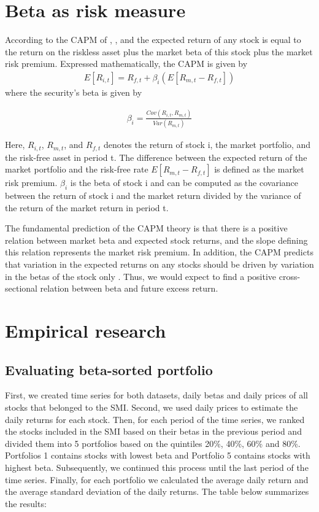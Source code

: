 \documentclass[12pt,a4paper]{article}
\begin{document}
\section{Beta as risk measure}
\begin{justify}
According to the CAPM of , , and  the expected return of any stock is equal to the return on the riskless asset plus the market beta of this stock plus the market risk premium. Expressed mathematically, the CAPM is given by
\begin{align}
    E[R_{i,t}] = R_{f,t}+\beta_{i}(E[R_{m,t}-R_{f,t}])
\end{align}
where the security’s beta is given by

\begin{align}
    \beta_{i} = \frac{Cov(R_{i,t},R_{m,t})}{Var(R_{m,t})} 
\end{align}

Here, $R_{i,t}$, $R_{m,t}$, and $R_{f,t}$ denotes the return of stock i, the market portfolio, and the risk-free asset in period t. The difference between the expected return of the market portfolio and the risk-free rate $E[R_{m,t}-R_{f,t}]$ is defined as the market risk premium. $\beta_{i}$ is the beta of stock i and can be computed as the covariance between the return of stock i and the market return divided by the variance of the return of the market return in period t.
 
The fundamental prediction of the CAPM theory is that there is a positive relation between market beta and expected stock returns, and the slope defining this relation represents the market risk premium. In addition, the CAPM predicts that variation in the expected returns on any stocks should be  driven by variation in the betas of the stock only \cite{Bali2016}. Thus, we would expect to find a positive cross-sectional relation between beta and future excess return.
\end{justify}

\section{Empirical research}
\subsection{Evaluating beta-sorted portfolio}
First, we created time series for both datasets, daily betas and daily prices of all stocks that belonged to the SMI. Second, we used daily prices to estimate the daily returns for each stock. Then, for each period of the time series, we ranked the stocks included in the SMI based on their betas in the previous period and divided them into 5 portfolios based on the quintiles 20\%, 40\%, 60\% and 80\%. Portfolios 1 contains stocks with lowest beta and Portfolio 5 contains stocks with highest beta. Subsequently, we continued this process until the last period of the time series. Finally, for each portfolio we calculated the average daily return and the average standard deviation of the daily returns. The table below summarizes the results:
~\\
\end{document}

